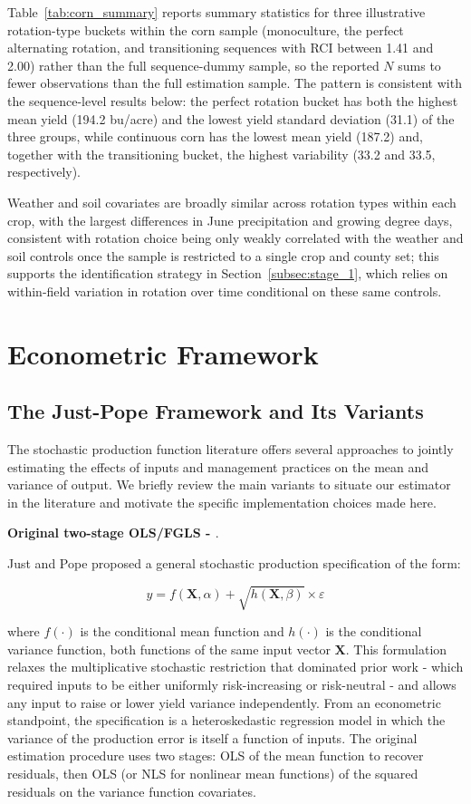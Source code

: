 \documentclass[12pt,letterpaper]{article}
\theoremstyle{remark}
\theoremstyle{remark}
\theoremstyle{plain}
\theoremstyle{definition}
\begin{document}
Table~\ref{tab:corn_summary} reports summary statistics for three illustrative rotation-type buckets within the corn sample (monoculture, the perfect alternating rotation, and transitioning sequences with RCI between 1.41 and 2.00) rather than the full sequence-dummy sample, so the reported $N$ sums to fewer observations than the full estimation sample. The pattern is consistent with the sequence-level results below: the perfect rotation bucket has both the highest mean yield (194.2 bu/acre) and the lowest yield standard deviation (31.1) of the three groups, while continuous corn has the lowest mean yield (187.2) and, together with the transitioning bucket, the highest variability (33.2 and 33.5, respectively).

Weather and soil covariates are broadly similar across rotation types within each crop, with the largest differences in June precipitation and growing degree days, consistent with rotation choice being only weakly correlated with the weather and soil controls once the sample is restricted to a single crop and county set; this supports the identification strategy in Section~\ref{subsec:stage_1}, which relies on within-field variation in rotation over time conditional on these same controls.

\section{Econometric Framework\label{sec:econ_framework}}
\subsection{\label{subsec:just_pope}The Just-Pope Framework and Its Variants}
The stochastic production function literature offers several approaches to jointly estimating the effects of inputs and management practices on the mean and variance of output. We briefly review the main variants to situate our estimator in the literature and motivate the specific implementation choices made here.

\medskip\noindent\textbf{Original two-stage OLS/FGLS - \cite{Just1978, Just1979}}.

Just and Pope proposed a general stochastic production specification of the form:

\begin{equation}
    y = f(\mathbf{X},\alpha)+\sqrt{h(\mathbf{X},\beta)}\times \varepsilon
\end{equation}

where $f(\cdot)$ is the conditional mean function and $h(\cdot)$ is the conditional variance function, both functions of the same input vector $\mathbf{X}$. This formulation relaxes the multiplicative stochastic restriction that dominated prior work - which
required inputs to be either uniformly risk-increasing or risk-neutral - and allows any input to raise or lower yield variance independently. From an econometric standpoint, the specification is a heteroskedastic regression model in which the variance of the production error is itself a function of inputs. The original estimation procedure uses two stages: OLS of the mean function to recover residuals, then OLS (or NLS for nonlinear mean functions) of the squared residuals on the variance function covariates.
\end{document}
